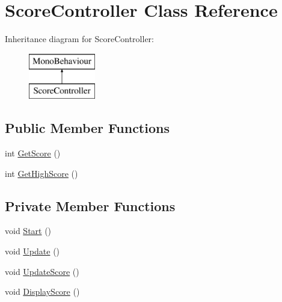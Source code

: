 \hypertarget{class_score_controller}{}\section{Score\+Controller Class Reference}
\label{class_score_controller}
Inheritance diagram for Score\+Controller\+:\begin{figure}[H]
\begin{center}
\leavevmode
\includegraphics[height=2.000000cm]{class_score_controller}
\end{center}
\end{figure}
\subsection*{Public Member Functions}
\begin{DoxyCompactItemize}
\item 
int \mbox{\hyperlink{class_score_controller_a0cf2ee76b1f2f6c07b2b76d036bfa8c6}{Get\+Score}} ()
\item 
int \mbox{\hyperlink{class_score_controller_abe909e78ac7e5c6632103249647a8ede}{Get\+High\+Score}} ()
\end{DoxyCompactItemize}
\subsection*{Private Member Functions}
\begin{DoxyCompactItemize}
\item 
void \mbox{\hyperlink{class_score_controller_a24c8b4f29b0e90a9bf721023cd1c581d}{Start}} ()
\item 
void \mbox{\hyperlink{class_score_controller_a30682b0eb78ea3820856810083221ee6}{Update}} ()
\item 
void \mbox{\hyperlink{class_score_controller_a7f3cae72611c80661f9e9b0bf300fe34}{Update\+Score}} ()
\item 
void \mbox{\hyperlink{class_score_controller_a5203e920a41f5155943e57c4b7f1872f}{Display\+Score}} ()
\end{DoxyCompactItemize}
